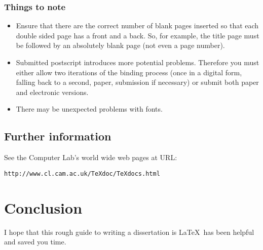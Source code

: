 \documentclass[12pt,twoside,notitlepage]{report}
\begin{document}
\subsection{Things to note}

\begin{itemize}
\item Ensure that there are the correct number of blank pages inserted
so that each double sided page has a front and a back.  So, for
example, the title page must be followed by an absolutely blank page
(not even a page number).

\item Submitted postscript introduces more potential problems.
Therefore you must either allow two iterations of the binding process
(once in a digital form, falling back to a second, paper, submission if
necessary) or submit both paper and electronic versions.

\item There may be unexpected problems with fonts.

\end{itemize}

\section{Further information}

See the Computer Lab's world wide web pages at URL:

{\tt http://www.cl.cam.ac.uk/TeXdoc/TeXdocs.html}


\cleardoublepage
\chapter{Conclusion}

I hope that this rough guide to writing a dissertation is \LaTeX\ has
been helpful and saved you time.
\end{document}
